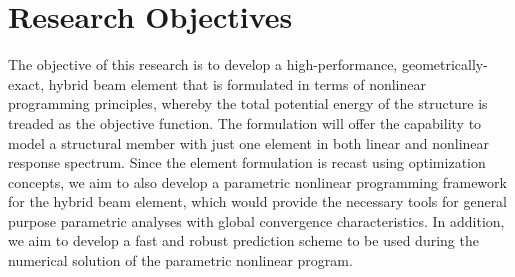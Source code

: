 \section{Research Objectives}
The objective of this research is to develop a high-performance, geometrically-exact, 
hybrid beam element that is formulated in terms of nonlinear programming principles, 
whereby the total potential energy of the structure is treaded as the objective 
function. The formulation will offer the capability to model a structural member with 
just one element in both linear and nonlinear response spectrum. Since the element 
formulation is recast using optimization concepts, we aim to also develop a parametric 
nonlinear programming framework for the hybrid beam element, which would provide the 
necessary tools for general purpose parametric analyses with global convergence 
characteristics. In addition, we aim to develop a fast and robust prediction scheme to 
be used during the numerical solution of the parametric nonlinear program. 

